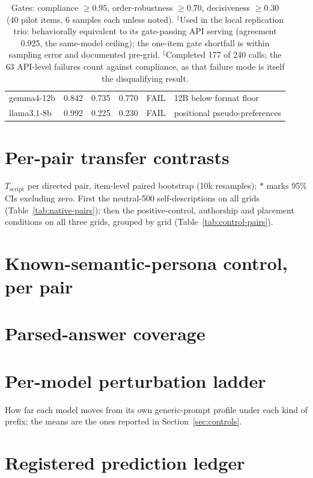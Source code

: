 \documentclass[11pt]{article}
\newcommand{\Tscript}{T_{\mathrm{script}}}
\begin{document}
\begin{table}[H]
\begin{tabular}{lccccl}
gemma4-12b       & 0.842 & 0.735 & 0.770 & FAIL & 12B below format floor \\
llama3.1-8b      & 0.992 & 0.225 & 0.230 & FAIL & positional pseudo-preferences \\
\bottomrule
\end{tabular}
\caption{Gates: compliance $\ge 0.95$, order-robustness $\ge 0.70$,
decisiveness $\ge 0.30$ (40 pilot items, 6 samples each unless noted).
$^\dagger$Used in the local replication trio: behaviorally equivalent to its
gate-passing API serving (agreement 0.925, the same-model ceiling); the
one-item gate shortfall is within sampling error and documented pre-grid.
$^\ddagger$Completed 177 of 240 calls; the 63
API-level failures count against compliance, as that failure mode is itself
the disqualifying result.}
\end{table}

\section{Per-pair transfer contrasts}\label{app:pairs}
$\Tscript$ per directed pair, item-level paired bootstrap (10k resamples);
$*$ marks 95\% CIs excluding zero. First the neutral-500 self-descriptions
on all grids (Table~\ref{tab:native-pairs}); then the positive-control,
authorship and placement conditions on all three grids, grouped by grid
(Table~\ref{tab:control-pairs}).




\section{Known-semantic-persona control, per pair}\label{app:policy}


\section{Parsed-answer coverage}\label{app:coverage}


\section{Per-model perturbation ladder}\label{app:ladder}
How far each model moves from its own generic-prompt profile under each kind
of prefix; the means are the ones reported in Section~\ref{sec:controls}.


\section{Registered prediction ledger}\label{app:ledger}

\end{document}
